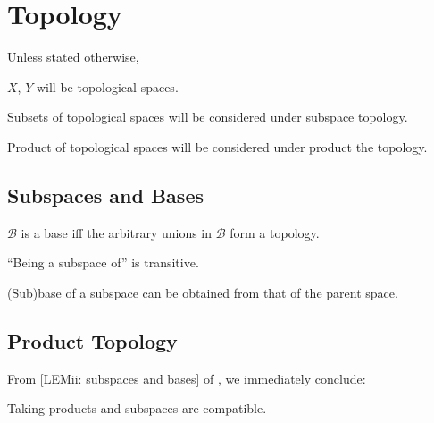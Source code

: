 \chapter{Topology}

\begin{conv}
	Unless stated otherwise,
	\begin{assmplist}
		\item $X$, $Y$ will be topological spaces.
		
		\item Subsets of topological spaces will be considered under subspace topology.
		
		\item Product of topological spaces will be considered under product the topology.
	\end{assmplist}
\end{conv}


\section{Subspaces and Bases}

	\begin{lem}
		$\mathscr B$ is a base iff the arbitrary unions in $\mathscr B$ form a topology.
	\end{lem}
	
	\begin{lem}\label{LEM: subspaces and bases}
		\leavevmode
		\begin{mylist}
			\item ``Being a subspace of'' is transitive.
			
			\item\label{LEMii: subspaces and bases} (Sub)base of a subspace can be obtained from that of the parent space.
		\end{mylist}
	\end{lem}



\section{Product Topology}

	From \ref{LEMii: subspaces and bases} of , we immediately conclude:

	\begin{lem}
		Taking products and subspaces are compatible.
	\end{lem}
	
